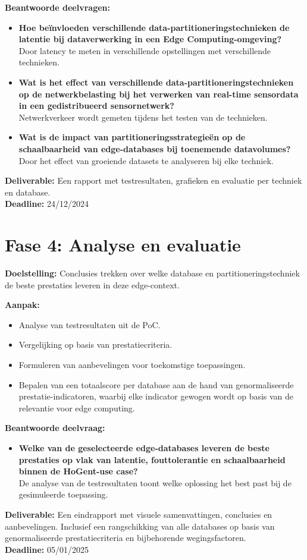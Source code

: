 \textbf{Beantwoorde deelvragen:}
\begin{itemize}
    \item \textbf{Hoe beïnvloeden verschillende data-partitioneringstechnieken de latentie bij dataverwerking in een Edge Computing-omgeving?} \\
    Door latency te meten in verschillende opstellingen met verschillende technieken.
    \item \textbf{Wat is het effect van verschillende data-partitioneringstechnieken op de netwerkbelasting bij het verwerken van real-time sensordata in een gedistribueerd sensornetwerk?} \\
    Netwerkverkeer wordt gemeten tijdens het testen van de technieken.
    \item \textbf{Wat is de impact van partitioneringsstrategieën op de schaalbaarheid van edge-databases bij toenemende datavolumes?} \\
    Door het effect van groeiende datasets te analyseren bij elke techniek.
\end{itemize}

\textbf{Deliverable:} Een rapport met testresultaten, grafieken en evaluatie per techniek en database. \\
\textbf{Deadline:} 24/12/2024

\section*{Fase 4: Analyse en evaluatie}

\textbf{Doelstelling:}  
Conclusies trekken over welke database en partitioneringstechniek de beste prestaties leveren in deze edge-context.

\textbf{Aanpak:}
\begin{itemize}
    \item Analyse van testresultaten uit de PoC.
    \item Vergelijking op basis van prestatiecriteria.
    \item Formuleren van aanbevelingen voor toekomstige toepassingen.
    \item Bepalen van een totaalscore per database aan de hand van genormaliseerde prestatie-indicatoren, waarbij elke indicator gewogen wordt op basis van de relevantie voor edge computing.
\end{itemize}

\textbf{Beantwoorde deelvraag:}
\begin{itemize}
    \item \textbf{Welke van de geselecteerde edge-databases leveren de beste prestaties op vlak van latentie, fouttolerantie en schaalbaarheid binnen de HoGent-use case?} \\
    De analyse van de testresultaten toont welke oplossing het best past bij de gesimuleerde toepassing.
\end{itemize}

\textbf{Deliverable:} Een eindrapport met visuele samenvattingen, conclusies en aanbevelingen. Inclusief een rangschikking van alle databases op basis van genormaliseerde prestatiecriteria en bijbehorende wegingsfactoren. \\
\textbf{Deadline:} 05/01/2025